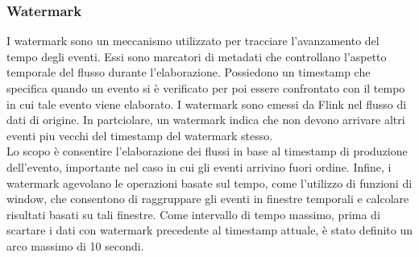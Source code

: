 \documentclass[8pt]{article}
\begin{document}
\subsubsection{Watermark}
I watermark sono un meccanismo utilizzato per tracciare l’avanzamento del
tempo degli eventi. Essi sono marcatori di metadati che controllano l’aspetto temporale del flusso durante l’elaborazione. Possiedono un timestamp che specifica quando un evento si è verificato per poi essere confrontato con il tempo in cui tale evento viene elaborato. I watermark sono emessi da Flink nel flusso di dati di origine. In partciolare, un watermark indica che non devono arrivare altri eventi piu vecchi del timestamp del watermark stesso.
\\Lo scopo è consentire l'elaborazione dei flussi in base al timestamp di produzione dell’evento, importante nel caso in cui gli eventi arrivino fuori ordine.
Infine, i watermark agevolano le operazioni basate sul tempo, come l’utilizzo di funzioni di window, che consentono di raggruppare gli eventi in finestre temporali e calcolare risultati basati su tali finestre.
Come intervallo di tempo massimo, prima di scartare i dati con watermark precedente al timestamp attuale, è stato definito un arco massimo di 10 secondi.
\end{document}

